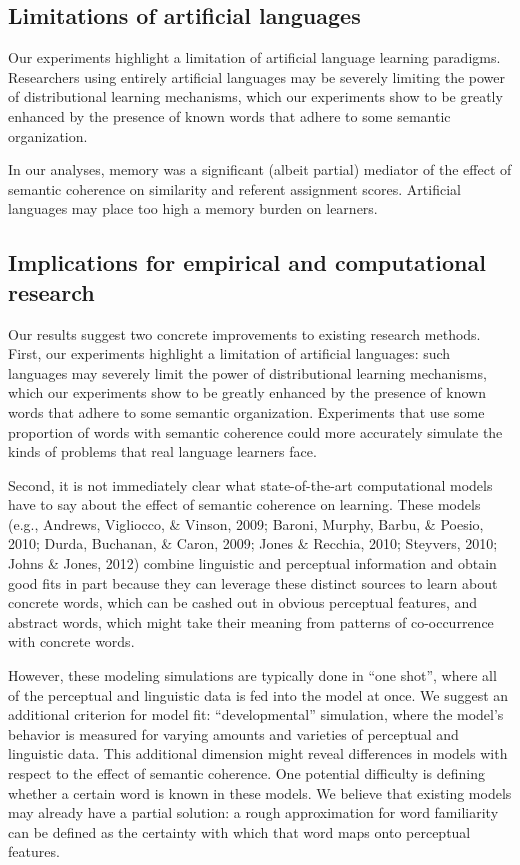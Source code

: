 \documentclass[man,floatsintext]{apa6}
\begin{document}
\subsection{Limitations of artificial languages}

Our experiments highlight a limitation of artificial language learning paradigms. Researchers using entirely artificial languages may be severely limiting the power of distributional learning mechanisms, which our experiments show to be greatly enhanced by the presence of known words that adhere to some semantic organization.

In our analyses, memory was a significant (albeit partial) mediator of the effect of semantic coherence on similarity and referent assignment scores. Artificial languages may place too high a memory burden on learners.

\subsection{Implications for empirical and computational research}

Our results suggest two concrete improvements to existing research methods. First, our experiments highlight a limitation of artificial languages: such languages may severely limit the power of distributional learning mechanisms, which our experiments show to be greatly enhanced by the presence of known words that adhere to some semantic organization. Experiments that use some proportion of words with semantic coherence could more accurately simulate the kinds of problems that real language learners face.

Second, it is not immediately clear what state-of-the-art computational models have to say about the effect of semantic coherence on learning. These models (e.g., Andrews, Vigliocco, \& Vinson, 2009; Baroni, Murphy, Barbu, \& Poesio, 2010; Durda, Buchanan, \& Caron, 2009; Jones \& Recchia, 2010; Steyvers, 2010; Johns \& Jones, 2012) combine linguistic and perceptual information and obtain good fits in part because they can leverage these distinct sources to learn about concrete words, which can be cashed out in obvious perceptual features, and abstract words, which might take their meaning from patterns of co-occurrence with concrete words.

However, these modeling simulations are typically done in ``one shot'', where all of the perceptual and linguistic data is fed into the model at once. We suggest an additional criterion for model fit: ``developmental'' simulation, where the model's behavior is measured for varying amounts and varieties of perceptual and linguistic data. This additional dimension might reveal differences in models with respect to the effect of semantic coherence. One potential difficulty is defining whether a certain word is known in these models. We believe that existing models may already have a partial solution: a rough approximation for word familiarity can be defined as the certainty with which that word maps onto perceptual features.
\end{document}
